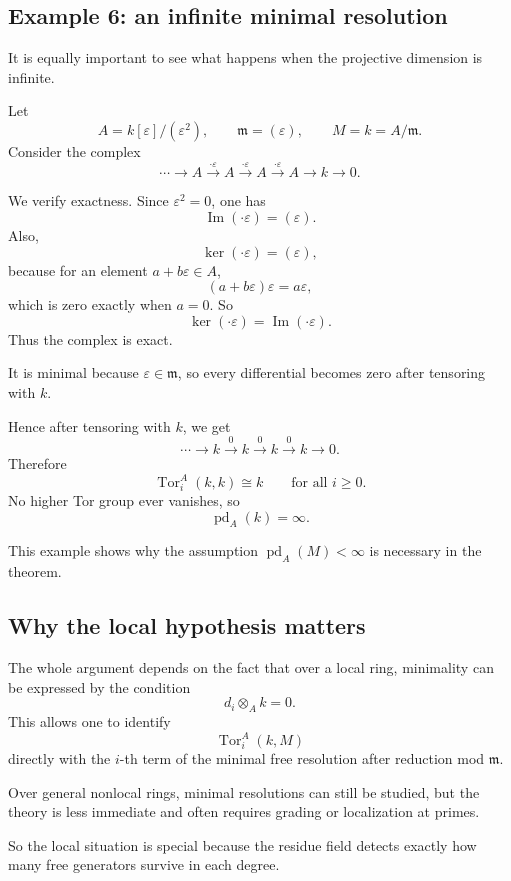 \documentclass[12pt,a4paper]{article}
\theoremstyle{notespace}
\DeclareMathOperator{\Tor}{Tor}
\begin{document}
\subsection{Example 6: an infinite minimal resolution}

It is equally important to see what happens when the projective dimension is infinite.

Let
\[
A=k[\varepsilon]/(\varepsilon^2),
\qquad
\mathfrak m=(\varepsilon),
\qquad
M=k=A/\mathfrak m.
\]
Consider the complex
\[
\cdots
\longrightarrow
A
\xrightarrow{\cdot \varepsilon}
A
\xrightarrow{\cdot \varepsilon}
A
\xrightarrow{\cdot \varepsilon}
A
\longrightarrow
k
\longrightarrow
0.
\]

We verify exactness. Since \(\varepsilon^2=0\), one has
\[
\operatorname{Im}(\cdot \varepsilon)=(\varepsilon).
\]
Also,
\[
\ker(\cdot \varepsilon)=(\varepsilon),
\]
because for an element \(a+b\varepsilon\in A\),
\[
(a+b\varepsilon)\varepsilon=a\varepsilon,
\]
which is zero exactly when \(a=0\). So
\[
\ker(\cdot \varepsilon)=\operatorname{Im}(\cdot \varepsilon).
\]
Thus the complex is exact.

It is minimal because \(\varepsilon\in \mathfrak m\), so every differential becomes zero after tensoring with \(k\).

Hence after tensoring with \(k\), we get
\[
\cdots \longrightarrow k \xrightarrow{0} k \xrightarrow{0} k \xrightarrow{0} k \longrightarrow 0.
\]
Therefore
\[
\Tor_i^A(k,k)\cong k
\qquad \text{for all } i\ge 0.
\]
No higher Tor group ever vanishes, so
\[
\operatorname{pd}_A(k)=\infty.
\]

This example shows why the assumption \(\operatorname{pd}_A(M)<\infty\) is necessary in the theorem.

\subsection{Why the local hypothesis matters}

The whole argument depends on the fact that over a local ring, minimality can be expressed by the condition
\[
d_i \otimes_A k = 0.
\]
This allows one to identify
\[
\Tor_i^A(k,M)
\]
directly with the \(i\)-th term of the minimal free resolution after reduction mod \(\mathfrak m\).

Over general nonlocal rings, minimal resolutions can still be studied, but the theory is less immediate and often requires grading or localization at primes.

So the local situation is special because the residue field detects exactly how many free generators survive in each degree.
\end{document}
